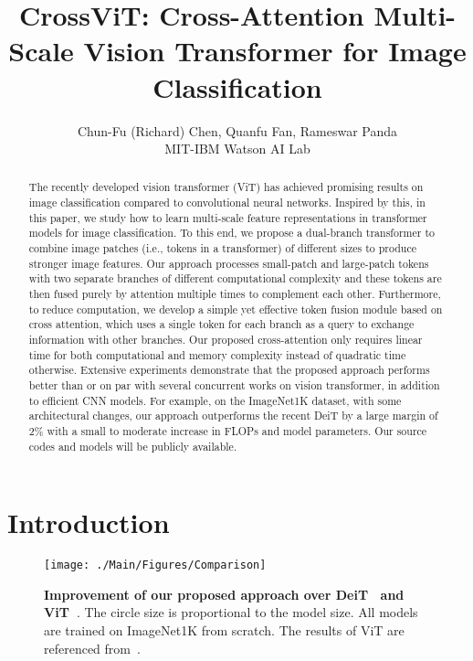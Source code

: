 \documentclass[10pt,twocolumn,letterpaper]{article}
\begin{document}
\title{CrossViT: Cross-Attention Multi-Scale Vision Transformer for Image Classification}

\author{Chun-Fu (Richard) Chen, Quanfu Fan, Rameswar Panda\\
MIT-IBM Watson AI Lab\\
}

\maketitle
\ificcvfinal\thispagestyle{empty}\fi

\begin{abstract}
The recently developed vision transformer (ViT) has achieved promising results on image classification compared to convolutional neural networks. Inspired by this, in this paper, we study how to learn multi-scale feature representations in transformer models for image classification. To this end, we propose a dual-branch transformer to combine image patches (i.e., tokens in a transformer) of different sizes to produce stronger image features. Our approach processes small-patch and large-patch tokens with two separate branches of different computational complexity and these tokens are then fused purely by attention multiple times to complement each other. Furthermore, to reduce computation, we develop a simple yet effective token fusion module based on cross attention, which uses a single token for each branch as a query to exchange information with other branches. Our proposed cross-attention only requires linear time for both computational and memory complexity instead of quadratic time otherwise. Extensive experiments demonstrate that the proposed approach performs better than or on par with several concurrent works on vision transformer, in addition to efficient CNN models. For example, on the ImageNet1K dataset, with some architectural changes, our approach outperforms the recent DeiT by a large margin of 2\% with a small to moderate increase in FLOPs and model parameters. Our source codes and models will be publicly available.
   
\end{abstract}

\section{Introduction}
\label{sec:intro}


\begin{figure}[tb!]
    \centering
    \texttt{[image: ./Main/Figures/Comparison]}
    \caption{\textbf{Improvement of our proposed approach over DeiT~\cite{DeiT_touvron2020} and ViT~\cite{ViT_dosovitskiy2021an}}. The circle size is proportional to the model size. All models are trained on ImageNet1K from scratch. The results of ViT are referenced from~\cite{tokenstotoken_yuan2021}.
}  
    \label{fig:perf_comp} 
\end{figure}
\end{document}
